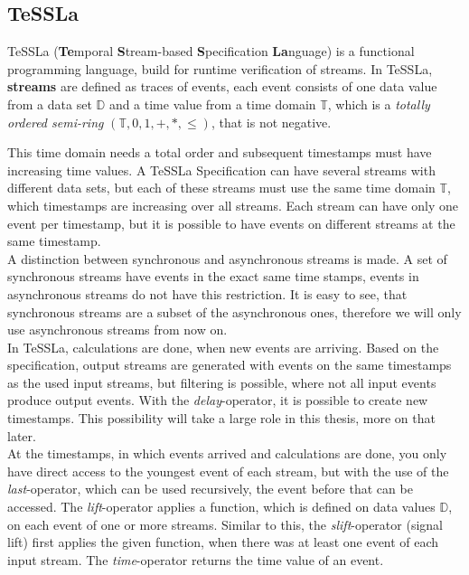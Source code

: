 	
	\subsection{TeSSLa}
	
		TeSSLa (\textbf{Te}mporal \textbf{S}tream-based \textbf{S}pecification \textbf{La}nguage) is a functional programming language, build for runtime verification of streams. In TeSSLa, \textbf{streams} are defined as traces of events, each event consists of one data value from a data set $\mathbb D$ and a time value from a time domain $\mathbb T$, which is a \emph{totally ordered semi-ring} $(\mathbb{T}, 0, 1, +, *, \leq)$, that is not negative.
		
		
		This time domain needs a total order and subsequent timestamps must have increasing time values. A TeSSLa Specification can have several streams with different data sets, but each of these streams must use the same time domain $\mathbb T$, which timestamps are increasing over all streams. Each stream can have only one event per timestamp, but it is possible to have events on different streams at the same timestamp.\\
		A distinction between synchronous and asynchronous streams is made. A set of synchronous streams have events in the exact same time stamps, events in asynchronous streams do not have this restriction. It is easy to see, that synchronous streams are a subset of the asynchronous ones, therefore we will only use asynchronous streams from now on.\\
		In TeSSLa, calculations are done, when new events are arriving. Based on the specification, output streams are generated with events on the same timestamps as the used input streams, but filtering is possible, where not all input events produce output events. With the \emph{delay}-operator, it is possible to create new timestamps. This possibility will take a large role in this thesis, more on that later.\\
		At the timestamps, in which events arrived and calculations are done, you only have direct access to the youngest event of each stream, but with the use of the \emph{last}-operator, which can be used recursively, the event before that can be accessed. The \emph{lift}-operator applies a function, which is defined on data values $\mathbb D$, on each event of one or more streams. Similar to this, the \emph{slift}-operator (signal lift) first applies the given function, when there was at least one event of each input stream. The \emph{time}-operator returns the time value of an event.\\
	
